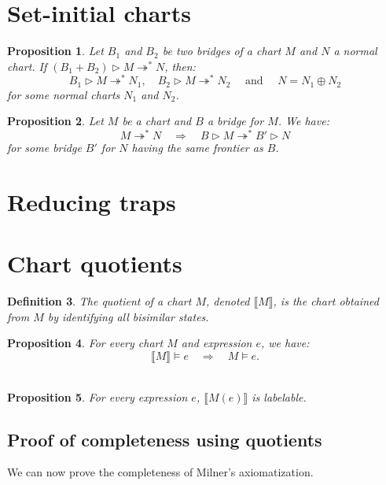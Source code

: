 \documentclass{article}
\newcommand{\quotient}[1]{\llbracket#1\rrbracket}          %
\newtheorem{definition}{Definition}[section]
\newtheorem{proposition}[definition]{Proposition}
\begin{document}
\section{Set-initial charts}

\begin{proposition} 
  Let $B_1$ and $B_2$ be two bridges of a chart $M$ and $N$ a normal chart. 
  If $(B_1+B_2)\triangleright M \twoheadrightarrow^* N$, then:
  $$B_1\triangleright M \twoheadrightarrow^* N_1,\quad  B_2\triangleright M \twoheadrightarrow^* N_2\quad  \text{ and } \quad N=N_1\oplus N_2$$
  for some normal charts $N_1$ and $N_2$.
\end{proposition}

\begin{proposition}
  Let $M$ be a chart and $B$ a bridge for $M$. We have: 
  $$ M \twoheadrightarrow^* N \quad \Longrightarrow \quad B\triangleright M \twoheadrightarrow^* B'\triangleright N $$
  for some bridge $B'$ for $N$ having the same frontier as $B$.
\end{proposition}
\section{Reducing traps}

\section{Chart quotients}


\begin{definition}
  The quotient of a chart $M$, denoted $\quotient{M}$, is the chart obtained from $M$ by identifying all bisimilar states.
\end{definition}

\begin{proposition} For every chart $M$ and expression $e$, we have:
  $$\quotient{M}\models e\quad \Longrightarrow\quad M\models e. $$~\label{prop:quotient-preserves-labelability}\vspace{-15pt}
\end{proposition}

\begin{proposition}For every expression $e$, $\quotient{M(e)}$ is labelable.~\label{prop:quotient-of-Milner-chart-is-labelable}
\end{proposition}

\subsection{Proof of completeness using quotients}
We can now prove the completeness of Milner's axiomatization.
\end{document}
